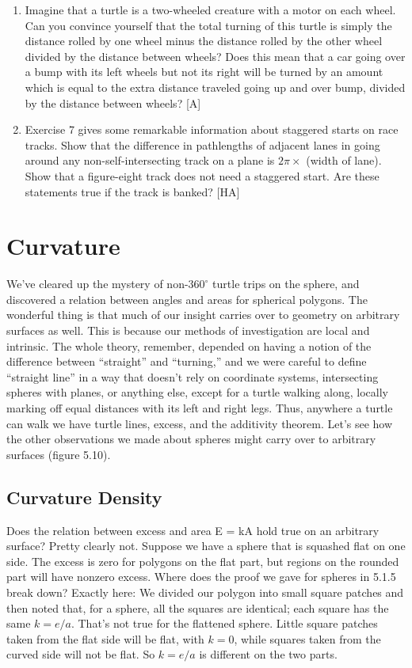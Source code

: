 \documentclass{book}
\begin{document}
\begin{enumerate}
\item Imagine that a turtle is a two-wheeled creature with a motor on each
wheel. Can you convince yourself that the total turning of this turtle is
simply the distance rolled by one wheel minus the distance rolled by the
other wheel divided by the distance between wheels? Does this mean
that a car going over a bump with its left wheels but not its right will
be turned by an amount which is equal to the extra distance traveled
going up and over bump, divided by the distance between wheels? [A]

\item Exercise 7 gives some remarkable information about staggered starts
on race tracks. Show that the difference in pathlengths of adjacent
lanes in going around any non-self-intersecting track on a plane is $2 \pi \times$
(width of lane). Show that a figure-eight track does not need a staggered
start. Are these statements true if the track is banked? [HA]
\end{enumerate}

\section{Curvature}

We've cleared up the mystery of non-$360^{\circ}$ turtle trips on the sphere, and
discovered a relation between angles and areas for spherical polygons.
The wonderful thing is that much of our insight carries over to geometry
on arbitrary surfaces as well. This is because our methods of investigation 
are local and intrinsic. The whole theory, remember, depended on
having a notion of the difference between ``straight'' and ``turning,'' and
we were careful to define ``straight line'' in a way that doesn't rely on
coordinate systems, intersecting spheres with planes, or anything else,
except for a turtle walking along, locally marking off equal distances
with its left and right legs. Thus, anywhere a turtle can walk we have
turtle lines, excess, and the additivity theorem. Let's see how the other
observations we made about spheres might carry over to arbitrary surfaces (figure 5.10).

\subsection{Curvature Density}

Does the relation between excess and area E = kA hold true on an
arbitrary surface? Pretty clearly not. Suppose we have a sphere that is
squashed flat on one side. The excess is zero for polygons on the flat
part, but regions on the rounded part will have nonzero excess. Where
does the proof we gave for spheres in 5.1.5 break down? Exactly here:
We divided our polygon into small square patches and then noted that,
for a sphere, all the squares are identical; each square has the same
$k = e/a$. That's not true for the flattened sphere. Little square patches
taken from the flat side will be flat, with $k = 0$, while squares taken
from the curved side will not be flat. So $k = e/a$ is different on the two
parts.
\end{document}
